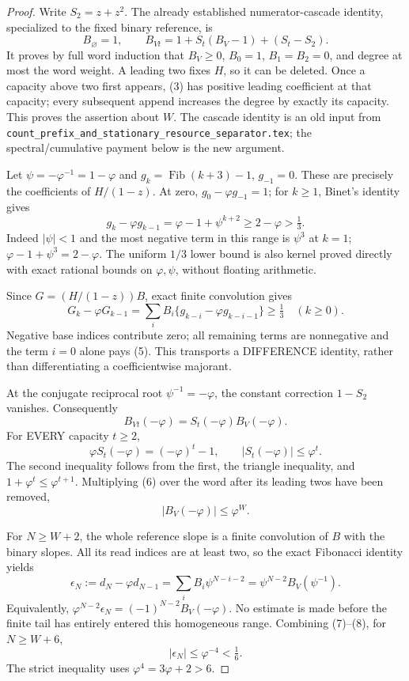 \begin{proof}
Write $S_2=z+z^2$. The already established numerator-cascade identity,
specialized to the fixed binary reference, is
\[
 B_\varnothing=1,\qquad
 B_{Vt}=1+S_t(B_V-1)+(S_t-S_2).                            \tag{3}
\]
It proves by full word induction that $B_V\ge0$, $B_0=1$,
$B_1=B_2=0$, and degree at most the word weight. A leading two
fixes $H$, so it can be deleted. Once a capacity above two first
appears, (3) has positive leading coefficient at that capacity;
every subsequent append increases the degree by exactly its capacity.
This proves the assertion about $W$.
The cascade identity is an old input from
\texttt{count\_prefix\_and\_stationary\_resource\_separator.tex};
the spectral/cumulative payment below is the new argument.

Let $\psi=-\varphi^{-1}=1-\varphi$ and
$g_k=\operatorname{Fib}(k+3)-1$, $g_{-1}=0$.
These are precisely the coefficients of $H/(1-z)$.
At zero, $g_0-\varphi g_{-1}=1$; for $k\ge1$, Binet's
identity gives
\[
 g_k-\varphi g_{k-1}=\varphi-1+\psi^{k+2}
                                  \ge2-\varphi>\tfrac13. \tag{4}
\]
Indeed $|\psi|<1$ and the most negative term in this range is
$\psi^3$ at $k=1$; $\varphi-1+\psi^3=2-\varphi$.
The uniform $1/3$ lower bound is also kernel proved directly with
exact rational bounds on $\varphi,\psi$, without floating arithmetic.

Since $G=(H/(1-z))B$, exact finite convolution gives
\[
 G_k-\varphi G_{k-1}
    =\sum_i B_i\{g_{k-i}-\varphi g_{k-i-1}\}\ge\tfrac13
                                               \quad(k\ge0). \tag{5}
\]
Negative base indices contribute zero; all remaining terms are
nonnegative and the term $i=0$ alone pays (5).
This transports a DIFFERENCE identity, rather than differentiating
a coefficientwise majorant.

At the conjugate reciprocal root $\psi^{-1}=-\varphi$,
the constant correction $1-S_2$ vanishes. Consequently
\[
                B_{Vt}(-\varphi)=S_t(-\varphi)B_V(-\varphi).
\]
For EVERY capacity $t\ge2$,
\[
 \varphi S_t(-\varphi)=(-\varphi)^t-1,\qquad
                         |S_t(-\varphi)|\le\varphi^t.     \tag{6}
\]
The second inequality follows from the first, the triangle inequality,
and $1+\varphi^t\le\varphi^{t+1}$.
Multiplying (6) over the word after its leading twos have been removed,
\[
                              |B_V(-\varphi)|\le\varphi^W. \tag{7}
\]

For $N\ge W+2$, the whole reference slope is a finite convolution
of $B$ with the binary slopes. All its read indices are at least two,
so the exact Fibonacci identity yields
\[
 \epsilon_N:=d_N-\varphi d_{N-1}
       =\sum_i B_i\psi^{N-i-2}
       =\psi^{N-2}B_V(\psi^{-1}).                         \tag{8}
\]
Equivalently,
$\varphi^{N-2}\epsilon_N=(-1)^{N-2}B_V(-\varphi)$.
No estimate is made before the finite tail has entirely entered this
homogeneous range. Combining (7)--(8), for $N\ge W+6$,
\[
                       |\epsilon_N|\le\varphi^{-4}<\tfrac16. \tag{9}
\]
The strict inequality uses $\varphi^4=3\varphi+2>6$.


\end{proof}

